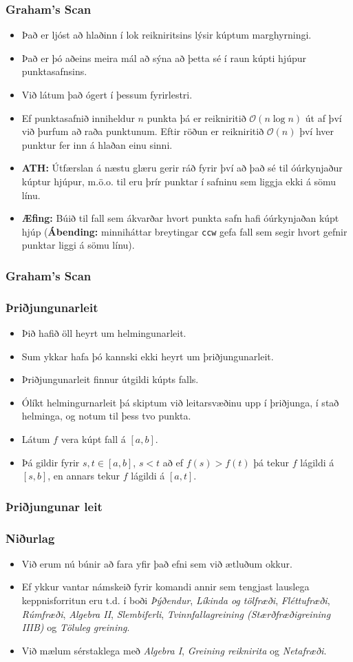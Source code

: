 \documentclass{beamer}
\newcommand\env[2]
{
	\begin{#1}
	#2
	\end{#1}
}
\newcommand\code[1]{\tiny}
\begin{document}
\env{frame}
{
	\frametitle{Graham's Scan}
	\env{itemize}
	{
		\item<1-> Það er ljóst að hlaðinn í lok reikniritsins lýsir kúptum marghyrningi.
		\item<2-> Það er þó aðeins meira mál að sýna að þetta sé í raun kúpti hjúpur punktasafnsins.
		\item<3-> Við látum það ógert í þessum fyrirlestri.
		\item<4-> Ef punktasafnið inniheldur $n$ punkta þá er reikniritið $\mathcal{O}(n \log n)$ út af því við þurfum að 
			raða punktunum. Eftir röðun er reikniritið $\mathcal{O}(n)$ því hver punktur fer inn á hlaðan einu sinni.
		\item<5-> {\bf ATH:} Útfærslan á næstu glæru gerir ráð fyrir því að það sé til óúrkynjaður kúptur hjúpur,
			m.ö.o. til eru þrír punktar í safninu sem liggja ekki á sömu línu.
		\item<6-> {\bf Æfing:} Búið til fall sem ákvarðar hvort punkta safn hafi óúrkynjaðan kúpt hjúp ({\bf Ábending:}
			minniháttar breytingar \texttt{ccw} gefa fall sem segir hvort gefnir punktar liggi á sömu línu).
	}
}

\env{frame}
{
	\frametitle{Graham's Scan}
	\code{convex_hull.h}
}

\env{frame}
{
	\frametitle{Þriðjungunarleit}
	\env{itemize}
	{
		\item<1-> Þið hafið öll heyrt um helmingunarleit.
		\item<2-> Sum ykkar hafa þó kannski ekki heyrt um þriðjungunarleit.
		\item<3-> Þriðjungunarleit finnur útgildi kúpts falls. 
		\item<4-> Ólíkt helmingurnarleit þá skiptum við leitarsvæðinu upp í þriðjunga, í stað helminga,
			og notum til þess tvo punkta.
		\item<5-> Látum $f$ vera kúpt fall á $[a, b]$.
		\item<6-> Þá gildir fyrir $s, t \in [a, b]$, $s < t$ að ef $f(s) > f(t)$ þá tekur $f$ lágildi
			á $[s, b]$, en annars tekur $f$ lágildi á $[a, t]$.
	}
}

\env{frame}
{
	\frametitle{Þriðjungunar leit}
	\code{ts.h}
}

\env{frame}
{
	\frametitle{Niðurlag}
	\env{itemize}
	{
		\item<1-> Við erum nú búnir að fara yfir það efni sem við ætluðum okkur.
		\item<2-> Ef ykkur vantar námskeið fyrir komandi annir sem tengjast lauslega keppnisforritun
			eru t.d. í boði \emph{Þýðendur}, \emph{Líkinda og tölfræði}, \emph{Fléttufræði},
			\emph{Rúmfræði}, \emph{Algebra II}, \emph{Slembiferli}, \emph{Tvinnfallagreining (Stærðfræðigreining IIIB)}
			og \emph{Töluleg greining}.
		\item<3-> Við mælum sérstaklega með \emph{Algebra I}, \emph{Greining reiknirita} og \emph{Netafræði}.
	}
}
\end{document}
